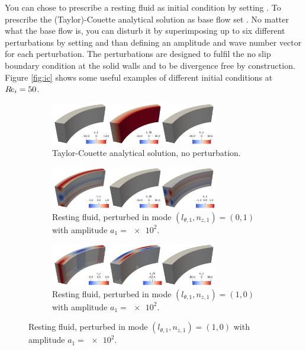 \documentclass[a4paper, 11pt, DIV=11]{scrartcl}
\begin{document}
You can chose to prescribe a resting fluid as initial condition by
setting . To prescribe the (Taylor)-Couette
analytical solution as base flow set . No matter
what the base flow is, you can disturb it by superimposing up to
six different perturbations by setting  and than
defining an amplitude and wave number vector for each perturbation.
The perturbations are designed to fulfil the no slip boundary
condition at the solid walls and to be divergence free by construction.
Figure \ref{fig:ic} shows some useful examples of different initial
conditions at $R\hspace{-0.1em}e_{i}=\num{50}$.
\begin{figure}
\begin{subfigure}{1.0\textwidth}
\centering
\includegraphics[width=0.8\textwidth]{figures/tc0039/icTaylorCouette.png}
\caption{Taylor-Couette analytical solution, no perturbation.}
\label{fig:tc0039icTayolorCouette}
\end{subfigure}
\vfill
\begin{subfigure}{1.0\textwidth}
\centering
\includegraphics[width=0.8\textwidth]{figures/tc0039/icPerturb01.png}
\caption{Resting fluid, perturbed in mode $(l_{\theta,1}, n_{z,1})=(0,1)$
with amplitude $a_{1}=\num{e2}$.}
\label{fig:tc0039icPerturb01}
\end{subfigure}
\vfill
\begin{subfigure}{1.0\textwidth}
\centering
\includegraphics[width=0.8\textwidth]{figures/tc0039/icPerturb10.png}
\caption{Resting fluid, perturbed in mode $(l_{\theta,1}, n_{z,1})=(1,0)$
with amplitude $a_{1}=\num{e2}$.}
\label{fig:tc0039icPerturb10}
\end{subfigure}

\end{figure}
\end{document}

